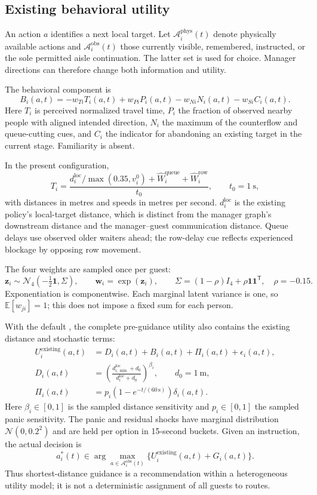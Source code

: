 \documentclass[11pt]{article}
\newcommand{\code}[1]{\texttt{\detokenize{#1}}}
\begin{document}
\subsection{Existing behavioral utility}
An action $a$ identifies a next local target. Let
$\mathcal A_i^{\mathrm{phys}}(t)$ denote physically available actions and
$\mathcal A_i^{\mathrm{obs}}(t)$ those currently visible, remembered, instructed,
or the sole permitted aisle continuation. The latter set is used for choice.
Manager directions can therefore change both information and utility.

The behavioral component is
\[
 B_i(a,t)=-w_{Ti}T_i(a,t)+w_{Pi}P_i(a,t)
                   -w_{Ni}N_i(a,t)-w_{Si}C_i(a,t).
\]
Here $T_i$ is perceived normalized travel time, $P_i$ the fraction of observed
nearby people with aligned intended direction, $N_i$ the maximum of the
counterflow and queue-cutting cues, and $C_i$ the indicator for abandoning an
existing target in the current stage. Familiarity is absent.

In the present configuration,
\[
 T_i=\frac{d_i^{\mathrm{loc}}/\max(0.35,v_i^0)
                  +\widehat W_i^{\mathrm{queue}}+\widehat W_i^{\mathrm{row}}}
                 {t_0},\qquad t_0=1\ \mathrm{s},
\]
with distances in metres and speeds in metres per second.
$d_i^{\mathrm{loc}}$ is the existing policy's local-target distance, which is
distinct from the manager graph's downstream distance and the manager--guest
communication distance. Queue delays use observed older waiters ahead; the
row-delay cue reflects experienced blockage by opposing row movement.

The four weights are sampled once per guest:
\[
 \mathbf z_i\sim\mathcal N_4(-\tfrac12\mathbf 1,\Sigma),\qquad
 \mathbf w_i=\exp(\mathbf z_i),\qquad
 \Sigma=(1-\rho)I_4+\rho\mathbf 1\mathbf 1^{\mathsf T},
 \quad\rho=-0.15.
\]
Exponentiation is componentwise. Each marginal latent variance is one, so
$\mathbb E[w_{ji}]=1$; this does not impose a fixed sum for each person.

With the default \code{behavioralOnly=false}, the complete pre-guidance utility
also contains the existing distance and stochastic terms:
\begin{align}
 U_i^{\mathrm{existing}}(a,t)
 &=D_i(a,t)+B_i(a,t)+\Pi_i(a,t)+\epsilon_i(a,t),\\
 D_i(a,t)&=\left(\frac{d_{i,\min}^{\mathrm{loc}}+d_0}
                            {d_i^{\mathrm{loc}}+d_0}\right)^{\beta_i},
             \qquad d_0=1\ \mathrm{m},\\
 \Pi_i(a,t)&=p_i\left(1-e^{-t/(60\,\mathrm{s})}\right)\delta_i(a,t).
\end{align}
Here $\beta_i\in[0,1]$ is the sampled distance sensitivity and $p_i\in[0,1]$
the sampled panic sensitivity. The panic and residual shocks have marginal
distribution $\mathcal N(0,0.2^2)$ and are held per option in 15-second buckets.
Given an instruction, the actual decision is
\[
 a_i^*(t)\in\arg\max_{a\in\mathcal A_i^{\mathrm{obs}}(t)}
                 \{U_i^{\mathrm{existing}}(a,t)+G_i(a,t)\}.
\]
Thus shortest-distance guidance is a recommendation within a heterogeneous
utility model; it is not a deterministic assignment of all guests to routes.
\end{document}
